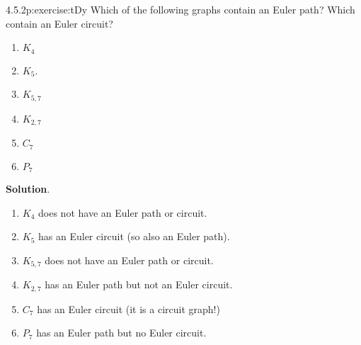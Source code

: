 \documentclass[twoside,11pt,]{book}
\newcommand{\blocktitlefont}{\relax}
\numberwithin{equation}{chapter}
\begin{document}
\begin{divisionsolution}{4.5.2}{}{p:exercise:tDy}%
Which of the following graphs contain an Euler path? Which contain an Euler circuit?%
\begin{multicols}{6}
\begin{enumerate}[label=(\alph*)]
\item{}\(\displaystyle K_4\)%
\item{}\(K_5\).%
\item{}\(\displaystyle K_{5,7}\)%
\item{}\(\displaystyle K_{2,7}\)%
\item{}\(\displaystyle C_7\)%
\item{}\(\displaystyle P_7\)%
\end{enumerate}
\end{multicols}
%
\par\smallskip%
\noindent\textbf{\blocktitlefont Solution}.\quad{}%
\begin{enumerate}[label=(\alph*)]
\item{}\(K_4\) does not have an Euler path or circuit.%
\item{}\(K_5\) has an Euler circuit (so also an Euler path).%
\item{}\(K_{5,7}\) does not have an Euler path or circuit.%
\item{}\(K_{2,7}\) has an Euler path but not an Euler circuit.%
\item{}\(C_7\) has an Euler circuit (it is a circuit graph!)%
\item{}\(P_7\) has an Euler path but no Euler circuit.%
\end{enumerate}
%
\end{divisionsolution}%
\end{document}
